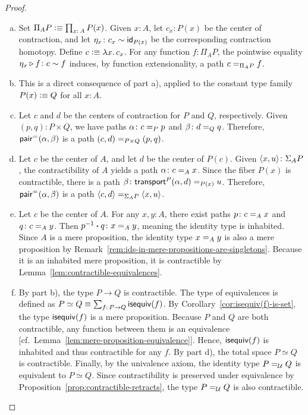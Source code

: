 \begin{proof}\ 

    \begin{enumerate}[a),font=\upshape]
        \item Set $\Pi_AP\defeq\prod_{x\colon A}P(x)$. Given $x\colon A$, let $c_x\colon P(x)$ be the center of contraction, and let $\eta_x\colon c_x\sim\id_{P(x)}$ be the corresponding contraction homotopy. Define $c\mathrel{\vcentcolon}\equiv\lambda x.\,c_x$. For any function $f\colon\Pi_AP$, the pointwise equality $\eta_x\rwct f\colon c\sim f$ induces, by function extensionality, a path $c\mathrel{=_{\Pi_AP}}f$.
        
        \item This is a direct consequence of part a), applied to the constant type family $P(x)\mathrel{\vcentcolon}\equiv Q$ for all $x\colon A$.
        
        \item Let $c$ and $d$ be the centers of contraction for $P$ and $Q$, respectively. Given $(p,q)\colon P\times Q$, we have paths $\alpha\colon c\eq{P}p$ and $\beta\colon d\eq{Q}q$. Therefore, $\mathsf{pair}^{\mathrel{=_{}}}(\alpha,\beta)$ is a path $(c,d)\mathrel{=_{P\times Q}}(p,q)$.
        
        \item Let $c$ be the center of $A$, and let $d$ be the center of $P(c)$. Given $\dep{x,u}\colon\Sigma_AP$, the contractibility of $A$ yields a path $\alpha\colon c\eq Ax$. Since the fiber $P(x)$ is contractible, there is a path $\beta\colon\fun{transport}^P(\alpha,d)\eq{P(x)}u$. Therefore, $\mathsf{pair}^{\mathrel{=_{}}}(\alpha,\beta)$ is a path $\langle c,d\rangle\mathrel{=_{\Sigma_AP}}\langle x,u\rangle$.
        
        \item Let $c$ be the center of $A$. For any $x,y\colon A$, there exist paths $p\colon c\eq Ax$ and $q\colon c\eq Ay$. Then $p^{-1}\ct q\colon x\eq Ay$, meaning the identity type is inhabited. Since $A$ is a mere proposition, the identity type $x\mathrel{=_{A}}y$ is also a mere proposition by Remark~\ref{rem:ids-in-mere-propositions-are-singletons}. Because it is an inhabited mere proposition, it is contractible by Lemma~\ref{lem:contractible-equivalences}.
        
        \item By part b), the type $P\to Q$ is contractible. The type of equivalences is defined as $P\simeq Q\equiv\sum_{f\colon P\to Q}\fun{isequiv}(f)$. By Corollary~\ref{cor:isequiv(f)-is-set}, the type $\mathsf{isequiv}(f)$ is a mere proposition. Because $P$ and $Q$ are both contractible, any function between them is an equivalence [cf.~Lemma~\ref{lem:mere-proposition-equivalence}]. Hence, $\mathsf{isequiv}(f)$ is inhabited and thus contractible for any $f$. By part d), the total space $P\simeq Q$ is contractible. Finally, by the univalence axiom, the identity type $P\mathrel{=_{\mathcal U}}Q$ is equivalent to $P\simeq Q$. Since contractibility is preserved under equivalence by Proposition~\ref{prop:contractible-retracts}, the type $P\mathrel{=_{\mathcal U}}Q$ is also contractible.
        

\end{enumerate}
\end{proof}
